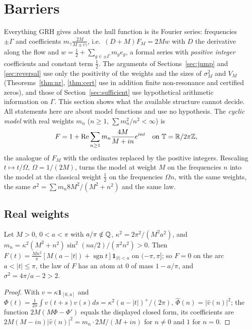 \section{Barriers}\label{sec:barriers}

Everything GRH gives about the hull function is its Fourier series: frequencies $\pm\Gamma$ and coefficients $m_\gamma\frac{2M}{M\pm i\gamma}$, i.e.\ $(D+M)F_M=2Mw$ with $D$ the derivative along the flow and $w=\frac12+\sum_{g\in\pm\Gamma}m_ge_g$, a formal series with \emph{positive integer} coefficients and constant term $\frac12$. The arguments of Sections~\ref{sec:jump} and \ref{sec:reversal} use only the positivity of the weights and the sizes of $\sigma_M^2$ and $V_M$ (Theorems~\ref{thm:nr}, \ref{thm:cert} use in addition finite non-resonance and certified zeros), and those of Section~\ref{sec:sufficient} use hypothetical arithmetic information on $\Gamma$. This section shows what the available structure cannot decide. All statements here are about model functions and use no hypothesis. The \emph{cyclic model} with real weights $m_n$ ($n\ge1$, $\sum m_n^2/n^2<\infty$) is
\[
F=1+\operatorname{Re}\sum_{n\ge1}m_n\frac{4M}{M+in}e^{int}\quad\text{on }\mathbb T=\mathbb R/2\pi\mathbb Z ,
\]
the analogue of $F_M$ with the ordinates replaced by the positive integers. Rescaling $t\mapsto t/\Omega$, $\Omega=1/(2M)$, turns the model at weight $M$ on the frequencies $n$ into the model at the classical weight $\frac12$ on the frequencies $\Omega n$, with the same weights, the same $\sigma^2=\sum m_n8M^2/(M^2+n^2)$ and the same law.

\subsection{Real weights}

\begin{proposition}[\rd{1 read}]\label{prop:model71}
Let $M>0$, $0<a<\pi$ with $a/\pi\notin\mathbb Q$, $\kappa^2=2\pi^2/(M^2a^2)$, and $m_n=\kappa^2(M^2+n^2)\sin^2(na/2)/(\pi^2n^2)>0$. Then $F(t)=\frac{M\kappa^2}\pi[M(a-|t|)+\operatorname{sgn}t]\mathbf 1_{|t|<a}$ on $(-\pi,\pi]$; so $F=0$ on the arc $a<|t|\le\pi$, the law of $F$ has an atom at $0$ of mass $1-a/\pi$, and $\sigma^2=4\pi/a-2>2$.
\end{proposition}

\begin{proof}
With $v=\kappa\mathbf 1_{[0,a]}$ and $\Phi(t)=\frac1{2\pi}\int v(t+s)v(s)ds=\kappa^2(a-|t|)^+/(2\pi)$, $\hat\Phi(n)=|\hat v(n)|^2$; the function $2M(M\Phi-\Phi')$ equals the displayed closed form, its coefficients are $2M(M-in)|\hat v(n)|^2=m_n\cdot2M/(M+in)$ for $n\ne0$ and $1$ for $n=0$.
\end{proof}

